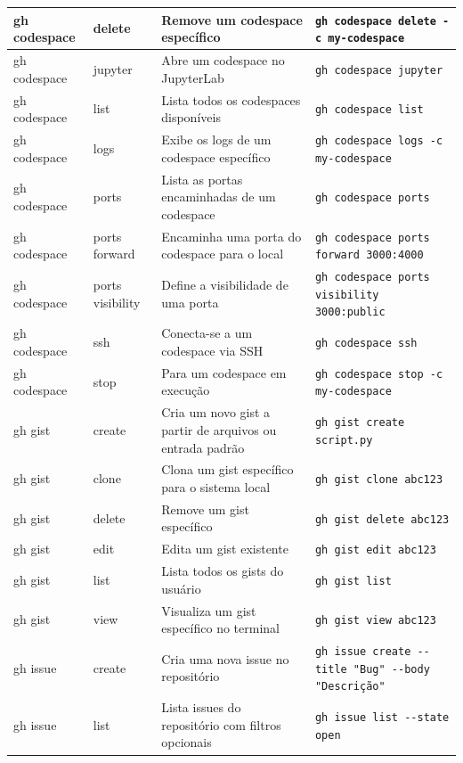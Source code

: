 \begin{longtable}{|p{2cm}|p{2.3cm}|p{4cm}|p{6cm}|}
    \hline
    gh codespace & delete & Remove um codespace específico & \texttt{gh codespace delete -c my-codespace} \\
    \hline
    gh codespace & jupyter & Abre um codespace no JupyterLab & \texttt{gh codespace jupyter} \\
    \hline
    gh codespace & list & Lista todos os codespaces disponíveis & \texttt{gh codespace list} \\
    \hline
    gh codespace & logs & Exibe os logs de um codespace específico & \texttt{gh codespace logs -c my-codespace} \\
    \hline
    gh codespace & ports & Lista as portas encaminhadas de um codespace & \texttt{gh codespace ports} \\
    \hline
    gh codespace & ports forward & Encaminha uma porta do codespace para o local & \texttt{gh codespace ports forward 3000:4000} \\
    \hline
    gh codespace & ports visibility & Define a visibilidade de uma porta & \texttt{gh codespace ports visibility 3000:public} \\
    \hline
    gh codespace & ssh & Conecta-se a um codespace via SSH & \texttt{gh codespace ssh} \\
    \hline
    gh codespace & stop & Para um codespace em execução & \texttt{gh codespace stop -c my-codespace} \\
    \hline
    gh gist & create & Cria um novo gist a partir de arquivos ou entrada padrão & \texttt{gh gist create script.py} \\
    \hline
    gh gist & clone & Clona um gist específico para o sistema local & \texttt{gh gist clone abc123} \\
    \hline
    gh gist & delete & Remove um gist específico & \texttt{gh gist delete abc123} \\
    \hline
    gh gist & edit & Edita um gist existente & \texttt{gh gist edit abc123} \\
    \hline
    gh gist & list & Lista todos os gists do usuário & \texttt{gh gist list} \\
    \hline
    gh gist & view & Visualiza um gist específico no terminal & \texttt{gh gist view abc123} \\
    \hline
    gh issue & create & Cria uma nova issue no repositório & \texttt{gh issue create -{-}title "Bug" -{-}body "Descrição"} \\
    \hline
    gh issue & list & Lista issues do repositório com filtros opcionais & \texttt{gh issue list -{-}state open} \\

\end{longtable}
